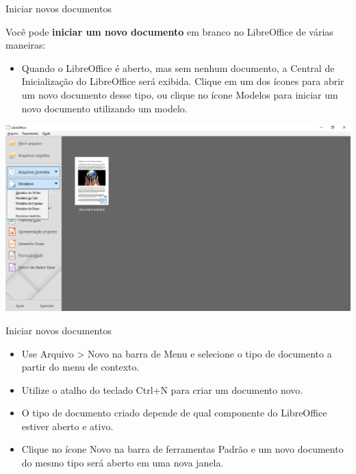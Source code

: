 \begin{frame}{Iniciar novos documentos}
	\begin{block}{}
		Você pode \textbf{iniciar um novo documento} em branco no LibreOffice de várias maneiras:
		\begin{itemize}
			\item Quando o LibreOffice é aberto, mas sem nenhum documento, a Central de Inicialização do LibreOffice será exibida. Clique em um dos ícones para abrir um novo documento desse tipo, ou clique no ícone Modelos para iniciar um novo documento utilizando um modelo.
		\end{itemize}
	\end{block}

	\centering
	\includegraphics[width=0.7\linewidth]{Figuras/Ch04/fig27.1}
\end{frame}


\begin{frame}{Iniciar novos documentos}
	\begin{block}{}
		\begin{itemize}
			\item Use Arquivo > Novo na barra de Menu e selecione o tipo de documento a partir do menu de contexto.
			\item Utilize o atalho do teclado Ctrl+N para criar um documento novo.
			\item O tipo de documento criado depende de qual componente do LibreOffice estiver aberto e ativo.
			\item Clique no ícone Novo na barra de ferramentas Padrão e um novo documento do mesmo tipo será aberto em uma nova janela.
		\end{itemize}
	\end{block}
\end{frame}


